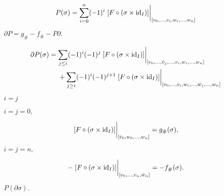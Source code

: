 \documentclass[10pt]{book}
\begin{document}
\begin{mdSnippets}
\begin{mdDisplaySnippet}[51abad51c57ee8e8f7a60e8a51f4a15c]
\[%
P(\sigma) = \sum_{i=0}^n (-1)^i \eval{\qty[F \circ (\sigma \times \id_I)]}_{[v_0, \dots, v_i, w_i, \dots, w_n]}
\]%
\end{mdDisplaySnippet}%
\begin{mdInlineSnippet}%
$\partial P = g_\# - f_\# - P\partial.$\end{mdInlineSnippet}%
\begin{mdDisplaySnippet}[e83f40789618261f22328e786f8836c4]%
\[%
\begin{aligned}
\partial P(\sigma) &= \sum_{j \le i} (-1)^i (-1)^j
\eval{[F \circ (\sigma \times \id_I)]}_{
  [v_0, \dots, \hat{v}_j, \dots, v_i, w_i, \dots, w_n]} \\
&\phantom{{}={}} + \sum_{j \ge i} (-1)^i (-1)^{j+1}
\eval{[F \circ (\sigma \times \id_I)]}_{
  [v_0, \dots, v_i, w_i, \dots, \hat{w}_j, \dots, w_n]}
\end{aligned}
\]%
\end{mdDisplaySnippet}%
\begin{mdInlineSnippet}[627d981a4b082e7396585b995ef51925]%
$i=j$\end{mdInlineSnippet}%
\begin{mdInlineSnippet}[98f6398bf6ca3c5adbea1f24c1914fc5]%
$i=j=0,$\end{mdInlineSnippet}%
\begin{mdDisplaySnippet}[f33085e30149932b35a2ecc13507839b]%
\[%
\eval{[F \circ (\sigma \times \id_I)]}_{
  [\hat{v}_0, w_0, \dots, w_n]} = g_\#(\sigma),
\]%
\end{mdDisplaySnippet}%
\begin{mdInlineSnippet}[9a96383a19c760dee139fc83c97f0e8b]%
$i=j=n,$\end{mdInlineSnippet}%
\begin{mdDisplaySnippet}[1b62643004f74569c7e0f35ff02bb564]%
\[%
-\eval{[F \circ (\sigma \times \id_I)]}_{
  [v_0, \dots, v_n, \hat{w}_n]} = -f_\#(\sigma).
\]%
\end{mdDisplaySnippet}%
\begin{mdInlineSnippet}[5e846e6a46e86cb904ce31e585fe322c]%
$P(\partial\sigma).$\end{mdInlineSnippet}%
\begin{mdInlineSnippet}[ce5b3597912972020ca35f5f69eda940]%

\end{mdInlineSnippet}
\end{mdSnippets}
\end{document}
